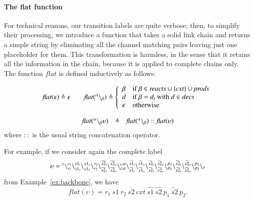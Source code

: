 \paragraph{The flat function}
For technical reasons, our transition labels are quite verbose; then, to simplify their processing, we introduce a function that takes a solid link chain and returns a simple string by eliminating all the channel matching pairs leaving just one placeholder for them. This transformation is harmless, in the sense that it retains all the information in the chain, because it is applied to complete chains only. 
The function $\mathit{flat}$ is defined inductively as follows:

\[
\mathit{flat}(\epsilon)\triangleq \epsilon 
\qquad
\mathit{flat}({}^{\alpha} \backslash_{\beta}) \triangleq 
\left \{ \begin{array}{ll} 
\beta & \mbox{if $\beta\in \mathit{reacts}\cup\{\mathit{cxt}\}\cup\mathit{prods}$}\\
d & \mbox{if $\beta=d_i$ with $d\in\mathit{decs}$}\\
\epsilon & \mbox{otherwise}  
\end{array} \right. 
\]

\[
\begin{array}{lcl}
\mathit{flat}({}^{\alpha} \backslash_{\beta}\upsilon)& \triangleq & \mathit{flat}({}^{\alpha} \backslash_{\beta}):: \mathit{flat}(\upsilon)\\
\end{array}\\
\]
where  $::$ is the usual string concatenation operator.

For example, if we consider again the complete label
$$
\upsilon =  {}^{\tau}
 \backslash_{r_1}^{r_1}
 \backslash_{s1_i}^{s1_i}
 \backslash_{s1_o}^{s1_o}
 \backslash_{r_2}^{r_2}
 \backslash_{\overline{s2}_i}^{\overline{s2}_i}
 \backslash_{\overline{s2}_o}^{\overline{s2}_o}
 \backslash_{\mathit{cxt}}^{\mathit{cxt}}
 \backslash_{\widehat{s1}_i}^{\widehat{s1}_i}
 \backslash_{\widehat{s1}_o}^{\widehat{s1}_o}
  \backslash_{\widehat{s2}_i}^{\widehat{s2}_i}
  \backslash_{\widehat{s2}_o}^{\widehat{s2}_o}
  \backslash_{p_1}^{p_1}
  \backslash_{\widetilde{s2}_i}^{\widetilde{s2}_i}
  \backslash_{\widetilde{s2}_o}^{\widetilde{s2}_o}
  \backslash_{p_2}^{p_2}
  \backslash_{\tau}
$$
from Example~\ref{ex:backbone}, we have
$$
\mathit{flat}(\upsilon) = 
r_1\ 
s1\ 
r_2\
\overline{s2}\ 
\mathit{cxt}\ 
\widehat{s1}\ 
\widehat{s2}\ 
p_1\ 
\widetilde{s2}\ 
p_2.
$$

